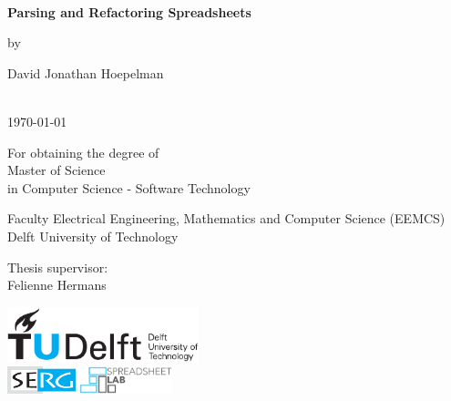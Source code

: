 \thispagestyle{empty}
\onecolumn
{%
\sffamily
\centering

~\vspace{\fill}

{\huge \bfseries
Parsing and Refactoring Spreadsheets
}

\vspace{2.0cm}

by

\vspace{2.0cm}

{\LARGE
David Jonathan Hoepelman
}

\vspace{2.5cm}

 \\
\today

\vspace{2cm}

For obtaining the degree of \\
Master of Science \\
in Computer Science - Software Technology \\

\vspace{0.5cm}

Faculty Electrical Engineering, Mathematics and Computer Science (EEMCS)\\
Delft University of Technology

\vspace{0.5cm}

Thesis supervisor: \\
Felienne Hermans

\vspace{1.5cm}

\includegraphics[height=16mm]{0-title/tudelft.pdf}
\\ %
\vspace{0.75cm}
\includegraphics[height=8mm]{0-title/serg}
\hspace{0.5cm}
\includegraphics[height=8mm]{0-title/spreadsheet-lab}

\vspace{\fill}

}